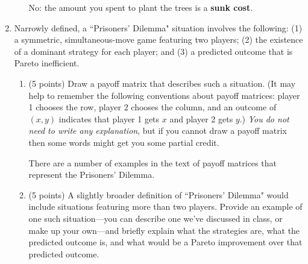 \documentclass{article}
\newcommand{\mybigskip}{\vspace{1in}}
\begin{document}
\begin{enumerate}
\begin{enumerate}
\begin{KEY}
No: the amount you spent to plant the trees is a \textbf{sunk cost}.
\end{KEY}
    \end{enumerate}









\item \begin{EXAM} Narrowly defined, a ``Prisoners' Dilemma" situation involves the following: (1) a symmetric, simultaneous-move game featuring two players; (2) the existence of a dominant strategy for each player; and (3) a predicted outcome that is Pareto inefficient.  \end{EXAM}

    \begin{enumerate}

    \item \begin{EXAM} (5 points) Draw a payoff matrix that describes such a situation. (It may help to remember the following conventions about payoff matrices: player 1 chooses the row, player 2 chooses the column, and an outcome of $(x,y)$ indicates that player 1 gets $x$ and player 2 gets $y$.) \emph{You do not need to write any explanation}, but if you cannot draw a payoff matrix then some words might get you some partial credit. \mybigskip\bigskip\bigskip \end{EXAM}

    \begin{KEY} There are a number of examples in the text of payoff matrices that represent the Prisoners' Dilemma. \end{KEY}

    \item \begin{EXAM} (5 points) A slightly broader definition of ``Prisoners' Dilemma" would include situations featuring more than two players. Provide an example of one such situation---you can describe one we've discussed in class, or make up your own---and briefly explain what the strategies are, what the predicted outcome is, and what would be a Pareto improvement over that predicted outcome. \vspace*{4cm} \end{EXAM}


\end{enumerate}
\end{enumerate}
\end{document}
